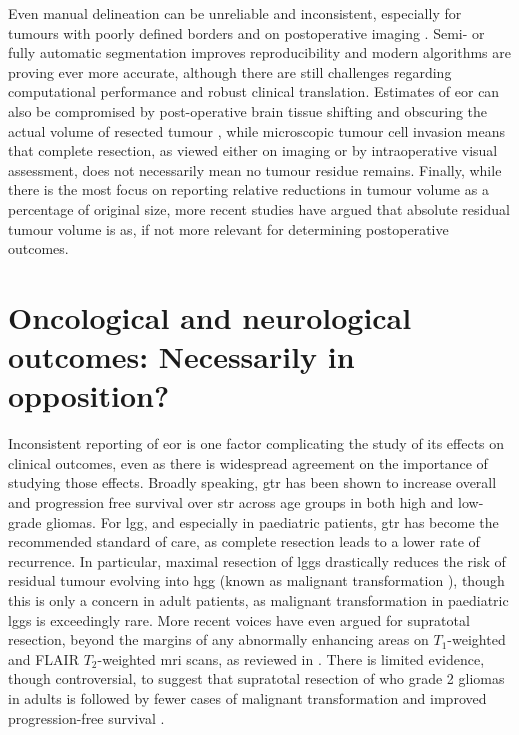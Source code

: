 Even manual delineation can be unreliable and inconsistent, especially for tumours with poorly defined borders and on postoperative imaging \autocite{Ertl-Wagner2009,Bo2017,Visser2019}.
Semi- or fully automatic segmentation improves reproducibility\autocite{Ertl-Wagner2009,Sezer2020} and modern algorithms are proving ever more accurate, although there are still challenges regarding computational performance and robust clinical translation\autocite{Angulakshmi2017,Wadhwa2019,Fawzi2021}.
Estimates of \gls{eor} can also be compromised by post-operative brain tissue shifting and obscuring the actual volume of resected tumour \autocite{Schucht2014a}, while microscopic tumour cell invasion means that complete resection, as viewed either on imaging or by intraoperative visual assessment, does not necessarily mean no tumour residue remains\autocite{Yordanova2017}.
Finally, while there is the most focus on reporting relative reductions in tumour volume as a percentage of original size, more recent studies have argued that absolute residual tumour volume is as, if not more relevant for determining postoperative outcomes\autocite{Ius2012,Rincon-Torroella2019,Smith2008,Karschnia2021}.

\section{Oncological and neurological outcomes: Necessarily in opposition?}

Inconsistent reporting of \gls{eor} is one factor complicating the study of its effects on clinical outcomes, even as there is widespread agreement on the importance of studying those effects\autocite{Rincon-Torroella2019,Wykes2021,Weller2021}.
Broadly speaking, \gls{gtr} has been shown to increase overall and progression free survival over \gls{str} across age groups in both high \autocite{Hatoum2022, Han2020, Adams2016, McCrea2015, Bloch2012, McGirt2009, Kramm2006} and low-grade \autocite{Keles2001, Pollack1995, Sanai2008} gliomas.
For \gls{lgg}, and especially in paediatric patients, \gls{gtr} has become the recommended standard of care, as complete resection leads to a lower rate of recurrence\autocite{Berger1994,Claus2005}.
In particular, maximal resection of \glspl{lgg} drastically reduces the risk of residual tumour evolving into \gls{hgg} (known as malignant transformation \autocite{Duffau2013,Hervey-Jumper2016,Rincon-Torroella2019}), though this is only a concern in adult patients, as malignant transformation in paediatric \glspl{lgg} is exceedingly rare\autocite{Collins2020}.
More recent voices have even argued for supratotal resection, beyond the margins of any abnormally enhancing areas on $T_1$-weighted and FLAIR $T_2$-weighted \gls{mri} scans, as reviewed in \textcite{deLeeuw2019}.
There is limited evidence, though controversial, to suggest that supratotal resection of \gls{who} grade 2 gliomas in adults is followed by fewer cases of malignant transformation and improved progression-free survival \autocite{Yordanova2011}.

